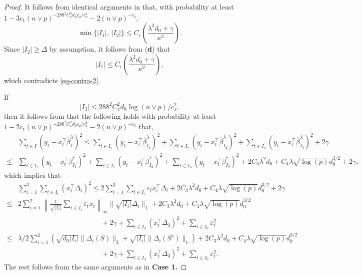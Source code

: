 \documentclass[twoside]{article}
\begin{document}
\begin{proof}
It follows from identical arguments in  that, with probability at least $1 - 3c_1 (n \vee p)^{-288^2C_x^2d_0c_2/c_x^2} - 2(n \vee p)^{-c_3}$,
	\[
		\min\{|I_1|,\, |I_2|\} \le C_{\epsilon} \left(\frac{\lambda^2 d_0 + \gamma}{\kappa^2}\right).
	\]
	Since $|I_2| \ge \Delta$ by assumption, it follows from (\textbf{d}) that
	\[
		|I_1|  \le C_{\epsilon} \left(\frac{\lambda^2 d_0 + \gamma}{\kappa^2}\right),
	\]
	which contradicts \eqref{eq-contra-2}.

\vskip 3mm
  If  
	\[
		|I_3| \leq 288^2 C^2_x d_0 \log(n \vee p)/c_x^2,
	\]
	then it follows from  that the following holds with probability at least $1 - 2c_1 (n \vee p)^{-288^2C_x^2d_0c_2/c_x^2} - 2(n \vee p)^{-c_3}$ that,
	\begin{align}
		& \sum_{t\in I } (y_t -x_t^{\top} \widehat \beta^\lambda_ I )^2 \leq \sum_{t\in I_1 } (y_t -x_t^{\top} \widehat \beta^\lambda_ {I_1}  )^2 + \sum_{t\in I_2 } (y_t -x_t^{\top} \widehat \beta^\lambda_ {I_2}  )^2  + \sum_{t\in I_3} (y_t -x_t^{\top} \widehat \beta^\lambda_ {I_3}  )^2 + 2\gamma \nonumber \\
		\leq &  \sum_{t \in I_1 } (y_t -x_t^{\top}   \beta^* _ {I_1}  )^2 + \sum_{t \in I_2 } (y_t -x_t^{\top}   \beta^* _ {I_2}  )^2 + \sum_{t \in I_3 } (y_t -x_t^{\top}   \beta^* _ {I_3}  )^2 + 2C_3 \lambda^2 d_0 + C_4 \lambda \sqrt{\log(p)} d_0^{3/2} + 2\gamma,  \nonumber
	\end{align}
	which implies that
	\begin{align}
		& \sum_{i=1}^3 \sum_{t\in I_i} (x_t^{\top}\Delta_i)^2 \leq 2 \sum_{i=1}^3 \sum_{t\in I_i} \varepsilon_t x_t^{\top} \Delta_i + 2C_3 \lambda^2 d_0 + C_4 \lambda \sqrt{\log(p)} d_0^{3/2} + 2\gamma \nonumber \\
		\leq & 2\sum_{i=1}^2 \left \| \frac{1}{\sqrt {|I_i| }} \sum_{t\in I_i } \varepsilon_t x_t  \right \|_{\infty } \| \sqrt { | I_i|}\Delta_i \|_1 + 2C_3 \lambda^2 d_0 + C_4 \lambda \sqrt{\log(p)} d_0^{3/2} \nonumber \\
		& \hspace{5cm} + 2\gamma + \sum_{t\in I_3} (x_t^{\top}\Delta_3)^2 + \sum_{t \in I_3}\varepsilon_t^2 \nonumber \\
	   \le & \lambda/2 \sum_{i=1}^2 \left(  \sqrt {d_0 |I_i| }\|\Delta_i(S)\|_2  + \sqrt {|I_i| } \|\Delta_i(S^c) \|_1 \right) + 2C_3 \lambda^2 d_0 + C_4 \lambda \sqrt{\log(p)} d_0^{3/2} \nonumber \\
	   & \hspace{5cm} + 2\gamma + \sum_{t\in I_3} (x_t^{\top}\Delta_3)^2 + \sum_{t \in I_3}\varepsilon_t^2. \nonumber 
	\end{align}
	The rest follows from the same arguments as in \textbf{Case 1.}
	
\end{proof} 
\end{document}
